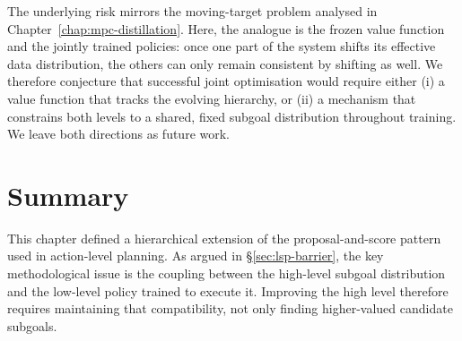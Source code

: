 The underlying risk mirrors the moving-target problem analysed in Chapter~\ref{chap:mpc-distillation}. Here, the analogue is the frozen value function and the jointly trained policies: once one part of the system shifts its effective data distribution, the others can only remain consistent by shifting as well. We therefore conjecture that successful joint optimisation would require either (i) a value function that tracks the evolving hierarchy, or (ii) a mechanism that constrains both levels to a shared, fixed subgoal distribution throughout training. We leave both directions as future work.

\section{Summary}
This chapter defined a hierarchical extension of the proposal-and-score
pattern used in action-level planning. As argued in
\S\ref{sec:lsp-barrier}, the key methodological issue is the coupling
between the high-level subgoal distribution and the low-level policy
trained to execute it. Improving the high level therefore requires
maintaining that compatibility, not only finding higher-valued candidate
subgoals.
